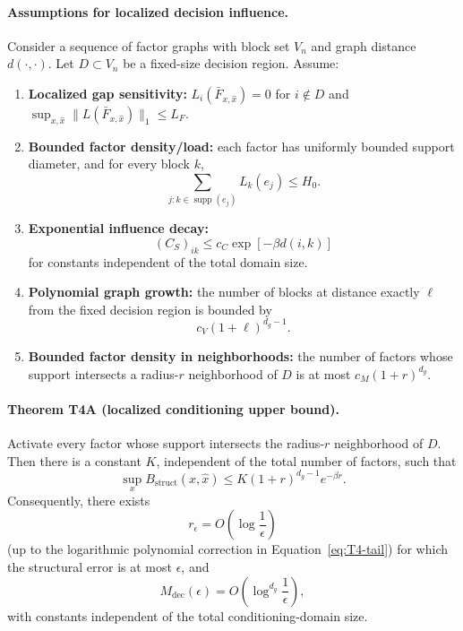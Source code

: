 \paragraph{Assumptions for localized decision influence.}
Consider a sequence of factor graphs with block set $V_n$ and graph distance
$d(\cdot,\cdot)$.  Let $D\subset V_n$ be a fixed-size decision region.
Assume:
\begin{enumerate}
    \item \textbf{Localized gap sensitivity:}
          $L_i(\bar F_{x,\widehat x})=0$ for $i\notin D$ and
          $\sup_{x,\widehat x}\|L(\bar F_{x,\widehat x})\|_1\le L_F$.
    \item \textbf{Bounded factor density/load:} each factor has uniformly
          bounded support diameter, and for every block $k$,
          \[
              \sum_{j:k\in\operatorname{supp}(e_j)}L_k(e_j)\le H_0.
          \]
    \item \textbf{Exponential influence decay:}
          \[
              (C_S)_{ik}\le c_C\exp[-\beta d(i,k)]
          \]
          for constants independent of the total domain size.
    \item \textbf{Polynomial graph growth:} the number of blocks at distance
          exactly $\ell$ from the fixed decision region is bounded by
          \[
              c_V(1+\ell)^{d_g-1}.
          \]
    \item \textbf{Bounded factor density in neighborhoods:} the number of
          factors whose support intersects a radius-$r$ neighborhood of $D$ is
          at most $c_M(1+r)^{d_g}$.
\end{enumerate}

\paragraph{Theorem T4A (localized conditioning upper bound).}
Activate every factor whose support intersects the radius-$r$ neighborhood of
$D$.  Then there is a constant $K$, independent of the total number of factors,
such that
\begin{equation}
    \sup_x B_{\mathrm{struct}}(x,\widehat x)
    \le
    K(1+r)^{d_g-1}e^{-\beta r}.
    \label{eq:T4-tail}
\end{equation}
Consequently, there exists
\[
    r_\epsilon=O\!\left(\log\frac{1}{\epsilon}\right)
\]
(up to the logarithmic polynomial correction in
Equation~\eqref{eq:T4-tail}) for which the structural error is at most
$\epsilon$, and
\begin{equation}
    M_{\mathrm{dec}}(\epsilon)
    =
    O\!\left(\log^{d_g}\frac{1}{\epsilon}\right),
    \label{eq:T4-Mdec}
\end{equation}
with constants independent of the total conditioning-domain size.


